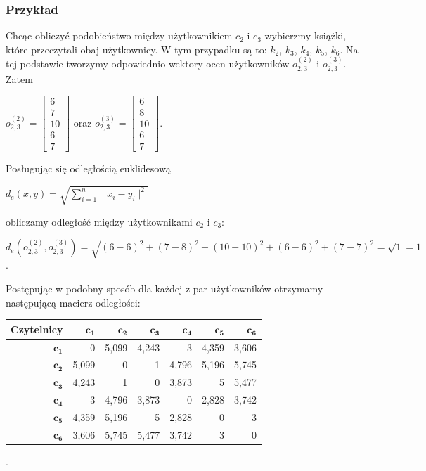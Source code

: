 \documentclass[12pt,a4paper]{report}
\begin{document}
\subsubsection{Przykład}
Chcąc obliczyć podobieństwo między użytkownikiem $c_2$ i $c_3$ wybierzmy książki, które przeczytali obaj użytkownicy. W tym przypadku są to: $k_2$, $k_3$, $k_4$, $k_5$, $k_6$. Na tej podstawie tworzymy odpowiednio wektory ocen użytkowników $o_{2,3} ^{(2)}$ i $o_{2,3}^{(3)}$. 
\\Zatem
\begin{center}
$o_{2,3} ^{(2)}= \left[
        \begin{array}{c}
         6 \\
         7 \\
         10 \\
         6 \\
         7
         \end{array}
      \right]$ oraz $o_{2,3}^{(3)} = \left[
        \begin{array}{c}
         6 \\
         8 \\
         10 \\
         6 \\
         7
         \end{array}
      \right]$.
\end{center}
Posługując się odległością euklidesową
\begin{center}
$d_{e}(x,y) = \sqrt{\sum_{i=1}^n \mid x_{i} - y_{i} \mid ^2 }$
\end{center}
obliczamy odległość między użytkownikami $c_2$ i $c_3$: 
\begin{center}
$d_{e}(o_{2,3}^{(2)},o_{2,3}^{(3)}) = \sqrt{(6-6)^2 + (7-8)^2 + (10-10)^2 + (6-6)^2 + (7-7)^2} = \sqrt{1} = 1$.
\end{center}
Postępując w podobny sposób dla każdej z par użytkowników otrzymamy następującą macierz odległości:
\begin{center}
\begin{tabular}{|r|r|r|r|r|r|r|} \hline
\textbf{Czytelnicy} & $\mathbf{c_1}$ & $\mathbf{c_2}$ & $\mathbf{c_3}$ & $\mathbf{c_4}$ & $\mathbf{c_5}$ & $\mathbf{c_6}$\\
\hline
$\mathbf{c_1}$ & 0 & 5,099 & 4,243 & 3 & 4,359 & 3,606 \\
\hline
$\mathbf{c_2}$ & 5,099 & 0 & 1 & 4,796 & 5,196 & 5,745\\
\hline
$\mathbf{c_3}$ & 4,243 & 1 & 0 & 3,873 & 5 & 5,477\\
\hline
$\mathbf{c_4}$ & 3 & 4,796 & 3,873 & 0 & 2,828 & 3,742 \\
\hline 
$\mathbf{c_5}$ & 4,359 & 5,196 & 5 & 2,828 & 0 & 3 \\
\hline 
$\mathbf{c_6}$ & 3,606 & 5,745 & 5,477 & 3,742 & 3 & 0 \\
\hline 
\end{tabular}.
\end{center}
\end{document}
